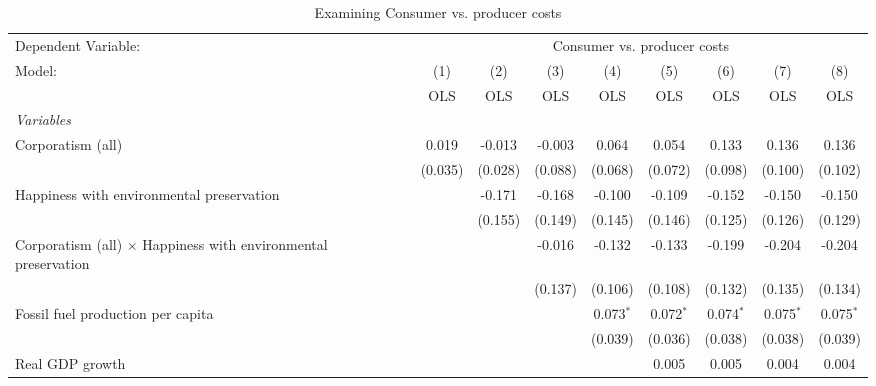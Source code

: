 
\begin{table}[htbp]
   \caption{Examining Consumer vs. producer costs}
   \centering
   \begin{tabular}{lcccccccc}
      \toprule
      Dependent Variable: & \multicolumn{8}{c}{Consumer vs. producer costs}\\
      Model:                                                                & (1)     & (2)     & (3)     & (4)         & (5)         & (6)         & (7)         & (8)\\  
                                                                            &  OLS    & OLS     & OLS     & OLS         & OLS         & OLS         & OLS         & OLS\\  
      \midrule
      \emph{Variables}\\
      Corporatism (all)                                                     & 0.019   & -0.013  & -0.003  & 0.064       & 0.054       & 0.133       & 0.136       & 0.136\\   
                                                                            & (0.035) & (0.028) & (0.088) & (0.068)     & (0.072)     & (0.098)     & (0.100)     & (0.102)\\   
      Happiness with environmental preservation                             &         & -0.171  & -0.168  & -0.100      & -0.109      & -0.152      & -0.150      & -0.150\\   
                                                                            &         & (0.155) & (0.149) & (0.145)     & (0.146)     & (0.125)     & (0.126)     & (0.129)\\   
      Corporatism (all) $\times$ Happiness with environmental preservation  &         &         & -0.016  & -0.132      & -0.133      & -0.199      & -0.204      & -0.204\\   
                                                                            &         &         & (0.137) & (0.106)     & (0.108)     & (0.132)     & (0.135)     & (0.134)\\   
      Fossil fuel production per capita                                     &         &         &         & 0.073$^{*}$ & 0.072$^{*}$ & 0.074$^{*}$ & 0.075$^{*}$ & 0.075$^{*}$\\   
                                                                            &         &         &         & (0.039)     & (0.036)     & (0.038)     & (0.038)     & (0.039)\\   
      Real GDP growth                                                       &         &         &         &             & 0.005       & 0.005       & 0.004       & 0.004\\   

\end{tabular}
\end{table}
